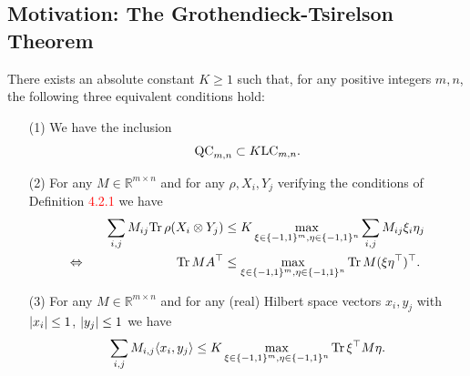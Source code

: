 \maketitle
\frame{\tableofcontents}

\subsection{Motivation: The Grothendieck-Tsirelson Theorem}
\frame{\tableofcontents[currentsubsection]}
	\begin{frame}
		\begin{theo}
			There exists an absolute constant $K\geq 1$ such that, for any positive integers $m,n$, the following three equivalent conditions hold:
			\begin{itemize}
				\item[(1)] We have the inclusion 
					\begin{equation}
						\textup{QC}_{m,n} \subset K\textup{LC}_{m,n}.
					\end{equation}
				\item[(2)] For any $M\in\mathbb{R}^{m\times n}$ and for any $\rho,X_i,Y_j$ verifying the conditions of Definition \textcolor{red}{4.2.1} we have
					\begin{align}
						\sum_{i,j} M_{ij} \textup{Tr} \, {\rho(X_i\otimes Y_j)}  &\leq K \max_{\xi\in\{-1,1\}^m,\eta\in\{-1,1\}^n} \sum_{i,j} M_{ij}\xi_i\eta_j \\
						\Leftrightarrow \hspace{2.5cm} \textup{Tr} \, {MA^\top}  &\leq \max_{\xi\in\{-1,1\}^m,\eta\in\{-1,1\}^n} \textup{Tr} \, {M(\xi\eta^\top)^\top} .
					\end{align}
					\item[(3)] For any $M\in\mathbb{R}^{m\times n}$ and for any (real) Hilbert space vectors $x_i,y_j$ with ${\left|{x_i}\right|}\leq 1$, ${\left|{y_j}\right|}\leq 1$ we have
						\begin{equation}
							\sum_{i,j} M_{i,j}\langle{x_i},{y_j}\rangle \leq K \max_{\xi\in\{-1,1\}^m,\eta\in\{-1,1\}^n} \textup{Tr} \, {\xi^\top M \eta} . \label{eq:G_ineq}
						\end{equation}
			\end{itemize}
		\end{theo}
	\end{frame}

